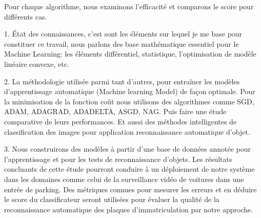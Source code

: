 		Pour chaque algorithme, nous examinons l'efficacité et comparons le score pour différents cas.
		\begin{list}{}{Les objectifs de notre travail regroupent les points suivants:}
			\item 1. État des connaissances, c’est sont les éléments sur lequel je me base pour constituer ce travail, nous parlons des base mathématique essentiel pour le Machine Learning: les éléments différentiel, statistique, l'optimisation de modèle linéaire convexe, etc.
			\item 2. La méthodologie utilisée parmi tant d’autres, pour entraîner les modèles d’apprentissage automatique (Machine learning Model) de façon optimale. Pour la minimisation de la fonction coût nous utilisons des algorithmes comme SGD, ADAM, ADAGRAD, ADADELTA, ASGD, NAG. Puis faire une étude comparative de leurs performances. 
			Et aussi des méthodes intelligentes de classification des images pour application reconnaissance automatique d’objet.
			
			\item 3. Nous construirons des modèles à partir d’une base de données annotée pour l'apprentissage et pour les tests de reconnaissance d'objets. Les résultats concluants de cette étude pourront conduire à un déploiement de notre système dans les domaines comme  celui de la surveillance vidéo de voitures dans une entrée de parking. Des métriques connues pour mesurer les erreurs et en déduire le score du classificateur seront utilisées pour évaluer la qualité de la reconnaissance automatique des plaques d’immatriculation par notre approche.
		\end{list}
	
	

		
		
		
		
